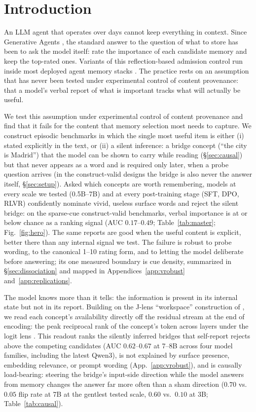 \section{Introduction}
\label{sec:intro}

An LLM agent that operates over days cannot keep everything in context. Since
Generative Agents \citep{park2023generative}, the standard answer to the question of what to store has been to ask the model
itself: rate the importance of each candidate memory and keep the top-rated
ones. Variants of this reflection-based admission
control run inside most deployed agent memory stacks
\citep{packer2023memgpt, zhong2023memorybank}. The practice rests on an assumption that has never been tested under
experimental control of content provenance: that a model's verbal report of
what is important tracks what will actually be useful.

We test this assumption under experimental control of content provenance and
find that it fails for the content that memory selection most needs to capture. We construct episodic
benchmarks in which the single most useful item is either (i) stated explicitly in
the text, or (ii) a silent inference: a bridge concept (``the city is Madrid'') that the model can be shown to carry while reading (\S\ref{sec:causal}) but that never appears
as a word and is required only later, when a probe question arrives (in the
construct-valid designs the bridge is also never the answer itself,
\S\ref{sec:setup}). Asked which concepts are worth remembering, models at every scale we tested
(0.5B--7B) and at every post-training stage (SFT, DPO, RLVR) confidently
nominate vivid, useless surface words and reject the silent bridge: on the
sparse-cue construct-valid benchmarks, verbal importance is at or below
chance as a ranking signal (AUC $0.17$--$0.49$; Table~\ref{tab:master};
Fig.~\ref{fig:hero}). The same reports are good when the useful content is
explicit, better there than any internal signal we test. The failure is robust to probe wording, to the canonical 1--10 rating form,
and to letting the model deliberate before answering; its one measured
boundary is cue density, summarized in \S\ref{sec:dissociation} and mapped
in Appendices~\ref{app:vrobust} and~\ref{app:replications}.

The model knows more than it tells: the information is present in its
internal state but not in its report.
Building
on the J-lens ``workspace'' construction of \citet{anthropic2026workspace}, we read
each concept's availability directly off the residual stream at the end of
encoding: the peak reciprocal rank of the concept's token across layers under the
logit lens \citep{nostalgebraist2020logitlens}. This readout ranks the silently inferred bridges that self-report rejects
above the competing candidates (AUC $0.62$--$0.67$ at 7--8B across four model
families, including the latest Qwen3), is not explained by surface presence, embedding relevance, or
prompt wording (App.~\ref{app:vrobust}), and is causally load-bearing: steering the
bridge's input-side direction while the model answers from memory changes the
answer far more often than a sham direction ($0.70$ vs.\ $0.05$ flip rate at
7B at the gentlest tested scale, $0.60$ vs.\ $0.10$ at 3B;
Table~\ref{tab:causal}).

